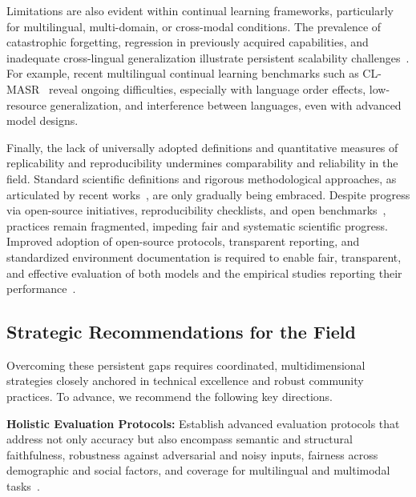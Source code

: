 \documentclass[sigconf]{acmart}
\begin{document}
Limitations are also evident within continual learning frameworks, particularly for multilingual, multi-domain, or cross-modal conditions. The prevalence of catastrophic forgetting, regression in previously acquired capabilities, and inadequate cross-lingual generalization illustrate persistent scalability challenges~\cite{ref70,ref80,ref81,ref82,ref83,ref102}. For example, recent multilingual continual learning benchmarks such as CL-MASR~\cite{ref102} reveal ongoing difficulties, especially with language order effects, low-resource generalization, and interference between languages, even with advanced model designs.

Finally, the lack of universally adopted definitions and quantitative measures of replicability and reproducibility undermines comparability and reliability in the field. Standard scientific definitions and rigorous methodological approaches, as articulated by recent works~\cite{ref13,ref16,ref17,ref22,ref23,ref24,ref33,ref34,ref45,ref53,ref55,ref58,ref59,ref61,ref66,ref67,ref107,ref108}, are only gradually being embraced. Despite progress via open-source initiatives, reproducibility checklists, and open benchmarks~\cite{ref33,ref104,ref106}, practices remain fragmented, impeding fair and systematic scientific progress. Improved adoption of open-source protocols, transparent reporting, and standardized environment documentation is required to enable fair, transparent, and effective evaluation of both models and the empirical studies reporting their performance~\cite{ref13,ref34,ref61,ref106,ref107,ref108}.

\subsection{Strategic Recommendations for the Field}

Overcoming these persistent gaps requires coordinated, multidimensional strategies closely anchored in technical excellence and robust community practices. To advance, we recommend the following key directions.

\textbf{Holistic Evaluation Protocols:}
Establish advanced evaluation protocols that address not only accuracy but also encompass semantic and structural faithfulness, robustness against adversarial and noisy inputs, fairness across demographic and social factors, and coverage for multilingual and multimodal tasks~\cite{ref5,ref9,ref10,ref12,ref15,ref18,ref19,ref21,ref22,ref23,ref34,ref36,ref37,ref38,ref43,ref45,ref46,ref48,ref49,ref50,ref55,ref61,ref62,ref63,ref64,ref65,ref66,ref67,ref68,ref69,ref70,ref71,ref72,ref73,ref74,ref75,ref76,ref77,ref78,ref79,ref80,ref81,ref82,ref83,ref84,ref85,ref86,ref87,ref88,ref89,ref90,ref91,ref92,ref93,ref94,ref95,ref101,ref102,ref104,ref105,ref106,ref107,ref108}.
\end{document}
